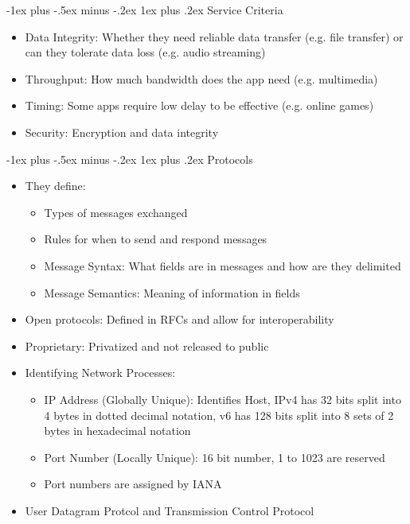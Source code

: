 \documentclass[10pt, landscape]{article}
\makeatletter
\renewcommand{\subsection}{\@startsection{subsection}{3}{0mm}%
                                {-1ex plus -.5ex minus -.2ex}%
                                {1ex plus .2ex}%
                                {\normalfont\small\bfseries}}%
\makeatother
\begin{document}
\begin{multicols*}{3}
\subsection{Service Criteria}
\begin{itemize}
    \item Data Integrity: Whether they need reliable data transfer (e.g. file transfer) or can they tolerate data loss (e.g. audio streaming)
    \item Throughput: How much bandwidth does the app need (e.g. multimedia)
    \item Timing: Some apps require low delay to be effective (e.g. online games)
    \item Security: Encryption and data integrity
\end{itemize}

\subsection{Protocols}
\begin{itemize}
    \item They define:
    \begin{itemize}
        \item Types of messages exchanged
        \item Rules for when to send and respond messages
        \item Message Syntax: What fields are in messages and how are they delimited
        \item Message Semantics: Meaning of information in fields
    \end{itemize}
    \item Open protocols: Defined in RFCs and allow for interoperability
    \item Proprietary: Privatized and not released to public
    \item Identifying Network Processes:
    \begin{itemize}
        \item IP Address (Globally Unique): Identifies Host, IPv4 has 32 bits split into 4 bytes in dotted decimal notation, v6 has 128 bits split into 8 sets of 2 bytes in hexadecimal notation
        \item Port Number (Locally Unique): 16 bit number, 1 to 1023 are reserved
        \item Port numbers are assigned by IANA
    \end{itemize}
    \item User Datagram Protcol and Transmission Control Protocol
\end{itemize}


\end{multicols*}
\end{document}
